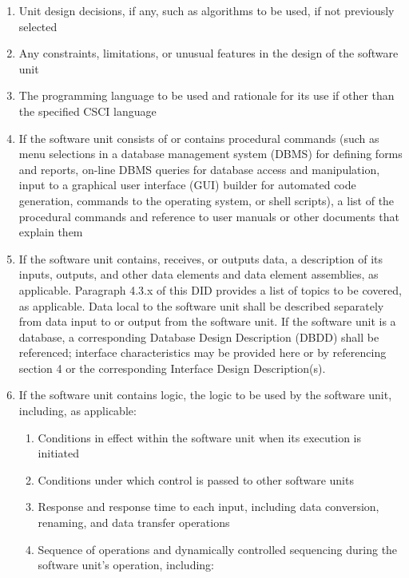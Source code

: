 \documentclass{fidata-report-template}
\begin{document}
\begin{enumerate}
\itemsep1pt\parskip0pt
\item
  Unit design decisions, if any, such as algorithms to be used, if not
  previously selected
\item
  Any constraints, limitations, or unusual features in the design of the
  software unit
\item
  The programming language to be used and rationale for its use if other
  than the specified CSCI language
\item
  If the software unit consists of or contains procedural commands (such
  as menu selections in a database management system (DBMS) for defining
  forms and reports, on-line DBMS queries for database access and
  manipulation, input to a graphical user interface (GUI) builder for
  automated code generation, commands to the operating system, or shell
  scripts), a list of the procedural commands and reference to user
  manuals or other documents that explain them
\item
  If the software unit contains, receives, or outputs data, a
  description of its inputs, outputs, and other data elements and data
  element assemblies, as applicable. Paragraph 4.3.x of this DID
  provides a list of topics to be covered, as applicable. Data local to
  the software unit shall be described separately from data input to or
  output from the software unit. If the software unit is a database, a
  corresponding Database Design Description (DBDD) shall be referenced;
  interface characteristics may be provided here or by referencing
  section 4 or the corresponding Interface Design Description(s).
\item
  If the software unit contains logic, the logic to be used by the
  software unit, including, as applicable:

  \begin{enumerate}
  \itemsep1pt\parskip0pt
  \item
    Conditions in effect within the software unit when its execution is
    initiated
  \item
    Conditions under which control is passed to other software units
  \item
    Response and response time to each input, including data conversion,
    renaming, and data transfer operations
  \item
    Sequence of operations and dynamically controlled sequencing during
    the software unit's operation, including:


\end{enumerate}
\end{enumerate}
\end{document}
